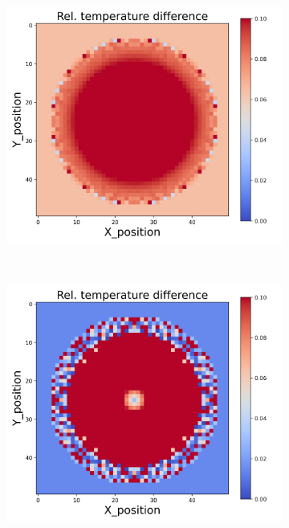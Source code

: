 {\begin{figure}[h]
\begin{minipage}{\textwidth}
\begin{subfigure}{0.27\textwidth}
        \end{subfigure}
        \begin{subfigure}{0.27\textwidth}
            \centering
            \includegraphics[width=\textwidth]{figures/raw_data/31/quad/T_bias.jpg}
        \end{subfigure}
    \end{minipage}\\
    \begin{minipage}{\textwidth}
        \centering
        \begin{subfigure}{0.27\textwidth}
            \centering
            \includegraphics[width=\textwidth]{figures/raw_data/32/quad/T_bias.jpg}

\end{subfigure}
\end{minipage}
\end{figure}}
